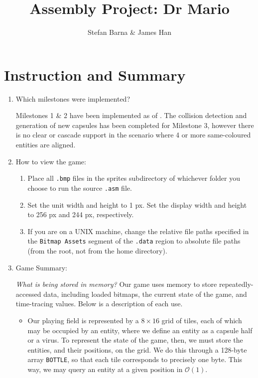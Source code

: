 \documentclass{article}
\title{Assembly Project: Dr Mario}
\author{Stefan Barna \& James Han}
\begin{document}
\maketitle
\section{Instruction and Summary}
\begin{enumerate}
\item Which milestones were implemented?

Milestones 1 \& 2 have been implemented as of \yyyymmdddate{\today}. The collision detection and generation of new capsules has been completed for Milestone 3, however there is no clear or cascade support in the scenario where 4 or more same-coloured entities are aligned.

\item How to view the game:
\begin{enumerate}
\item Place all \verb|.bmp| files in the sprites subdirectory of whichever folder you choose to run the source \verb|.asm| file.
\item Set the unit width and height to 1 px. Set the display width and height to 256 px and 244 px, respectively.
\item If you are on a UNIX machine, change the relative file paths specified in the \verb|Bitmap Assets| segment of the \verb|.data| region to absolute file paths (from the root, not from the home directory).
\end{enumerate}

\item Game Summary:

\textit{What is being stored in memory?} Our game uses memory to store repeatedly-accessed data, including loaded bitmaps, the current state of the game, and time-tracing values. Below is a description of each use.

\begin{itemize}
\item Our playing field is represented by a $8\times 16$ grid of tiles, each of which may be occupied by an entity, where we define an entity as a capsule half or a virus. To represent the state of the game, then, we must store the entities, and their positions, on the grid. We do this through a 128-byte array \verb|BOTTLE|, so that each tile corresponds to precisely one byte. This way, we may query an entity at a given position in $\mathcal{O}(1)$.


\end{itemize}
\end{enumerate}
\end{document}
